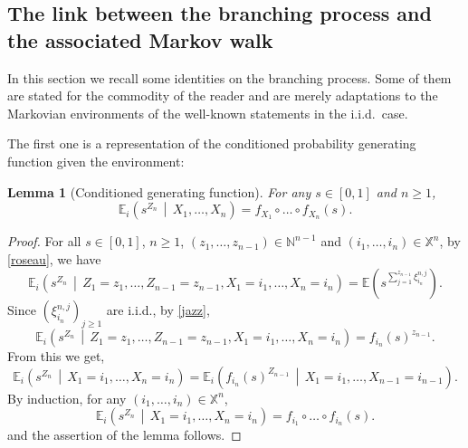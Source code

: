 \documentclass[12pt]{amsart}
\newtheorem{lemma}[theorem]{Lemma}
\theoremstyle{definition}
\numberwithin{equation}{section}
\newcommand*{\sachant}[2]{\left.#1 \,\middle|\,#2\right.}
\def\bb#1{\mathbb{#1}}
\def\geq{\geqslant}
\begin{document}
\subsection{The link between the branching process and the associated Markov walk}
\label{etang}
In this section we recall some identities on the branching process. Some of them are stated for the commodity of the reader and are merely adaptations to the Markovian environments of the well-known statements in the i.i.d.\ case.

The first one is a representation of the conditioned probability generating function given the environment:

\begin{lemma}[Conditioned generating function]
\label{CondGenFun}
For any $s\in [0,1]$ and $n \geq 1$,
\[
\bb E_i \left( \sachant{s^{Z_{n}}}{X_1, \dots, X_{n} } \right) = f_{X_1} \circ \dots \circ f_{X_n} (s).
\]
\end{lemma}

\begin{proof}
For all $s\in[0,1]$, $n \geq 1$, $(z_1, \dots, z_{n-1}) \in \bb N^{n-1}$ and $(i_1, \dots,i_{n}) \in \bb X^{n}$, by \eqref{roseau}, we have
\[
\bb E_i \left( \sachant{s^{Z_{n}} }{Z_1=z_1, \dots, Z_{n-1}=z_{n-1}, X_1=i_1, \dots, X_{n} = i_{n}} \right) = \bb E \left( s^{\sum_{j=1}^{z_{n-1}} \xi_{i_{n}}^{n,j}} \right).
\] 
Since $\left( \xi_{i_{n}}^{n,j} \right)_{j \geq 1}$ are i.i.d., by \eqref{jazz},
\[
\bb E_i \left( \sachant{s^{Z_{n}}}{Z_1=z_1, \dots, Z_{n-1}=z_{n-1}, X_1=i_1, \dots, X_{n}=i_{n}} \right) = f_{i_{n}} (s)^{z_{n-1}}.
\]
From this we get,
\[
\bb E_i \left( \sachant{s^{Z_{n}}}{X_1=i_1, \dots, X_{n} = i_n} \right) 
= \bb E_i \left( \sachant{ f_{i_n} (s)^{Z_{n-1}} }{X_1=i_1, \dots, X_{n-1}=i_{n-1}} \right).
\]
By induction, for any $(i_1, \dots,i_{n}) \in \bb X^{n}$,
\[
\bb E_i \left( \sachant{s^{Z_{n}}}{X_1=i_1, \dots, X_{n}=i_{n} } \right) = f_{i_1} \circ \dots \circ f_{i_n} (s).
\]
and the assertion of the lemma follows.
\end{proof}
\end{document}
